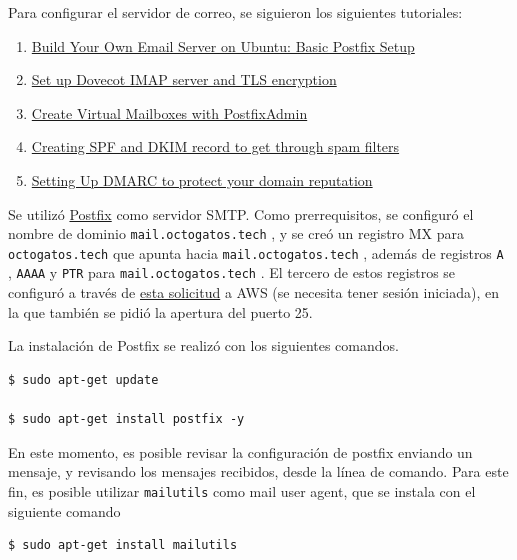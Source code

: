 \documentclass{article}
\newcommand{\ttt}[1]{%
\texttt{#1}%
}
\begin{document}
Para configurar el servidor de correo, se siguieron
los siguientes tutoriales:

\begin{enumerate}
  \item \href{https://www.linuxbabe.com/mail-server/setup-basic-postfix-mail-sever-ubuntu}{Build Your Own Email Server on Ubuntu: Basic Postfix Setup}

  \item \href{https://www.linuxbabe.com/mail-server/secure-email-server-ubuntu-postfix-dovecot}{Set up Dovecot IMAP server and TLS encryption}

  \item \href{https://www.linuxbabe.com/mail-server/postfixadmin-create-virtual-mailboxes-ubuntu-20-04}{Create Virtual Mailboxes with PostfixAdmin}

  \item \href{https://www.linuxbabe.com/mail-server/setting-up-dkim-and-spf}{Creating SPF and DKIM record to get through spam filters}

  \item \href{https://www.linuxbabe.com/mail-server/create-dmarc-record}{Setting Up DMARC to protect your domain reputation}
\end{enumerate}

Se utiliz\'o \href{http://www.postfix.org/}{Postfix} como
servidor SMTP.   Como prerrequisitos, se configur\'o el
nombre de dominio \ttt{mail.octogatos.tech}, y se cre\'o
un registro MX para \ttt{octogatos.tech} que apunta hacia
\ttt{mail.octogatos.tech}, adem\'as de registros \ttt{A},
\ttt{AAAA} y \ttt{PTR} para \ttt{mail.octogatos.tech}.
El tercero de estos registros se configur\'o a trav\'es
de \href{https://aws-portal.amazon.com/gp/aws/html-forms-controller/contactus/ec2-email-limit-rdns-request}{esta solicitud}
a AWS (se necesita tener sesi\'on iniciada), en la que
tambi\'en se pidi\'o la apertura del puerto 25.

La instalaci\'on de Postfix se realiz\'o con los
siguientes comandos.
\begin{lstlisting}
$ sudo apt-get update

$ sudo apt-get install postfix -y
\end{lstlisting}

En este momento, es posible revisar la configuraci\'on
de postfix enviando un mensaje, y revisando los mensajes
recibidos, desde la l\'inea de comando.   Para este fin,
es posible utilizar \ttt{mailutils} como mail user
agent, que se instala con el siguiente comando
\begin{lstlisting}
$ sudo apt-get install mailutils
\end{lstlisting}
\end{document}
